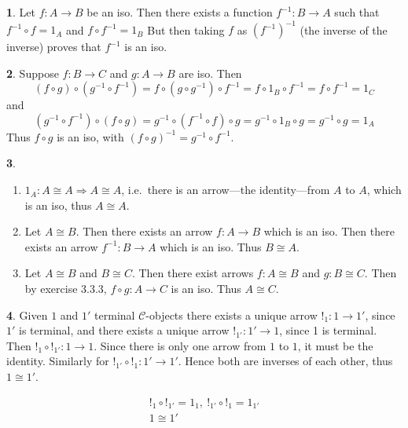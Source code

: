\documentclass{article}
\theoremstyle{definition}
\newcommand{\CC}{\mathscr{C}}
\theoremstyle{definition}
\newtheorem{solution-internal}{}[subsection]
\newenvironment{solution}{
  \begin{solution-internal}
}{
  \end{solution-internal}
}
\begin{document}
\begin{solution} 
  Let $f\colon A \to B$ be an iso. Then there exists a function $f^{-1}\colon
  B \to A$ such that $f^{-1} \circ f = 1_A$ and $f \circ f^{-1} = 1_B$ But
  then taking $f$ as ${(f^{-1})}^{-1}$ (the inverse of the inverse) proves
  that $f^{-1}$ is an iso.
\end{solution}

\begin{solution}
  Suppose $f\colon B \to C$ and $g\colon A \to B$ are iso. Then 
  \[ (f \circ g) \circ (g^{-1} \circ f^{-1}) = f \circ (g \circ g^{-1}) \circ
  f^{-1} = f \circ 1_B \circ f^{-1} = f \circ f^{-1} = 1_C \]
  and 
  \[  (g^{-1} \circ f^{-1}) \circ (f \circ g) = g^{-1} \circ (f^{-1} \circ f)
  \circ g = g^{-1} \circ 1_B \circ g =  g^{-1} \circ g = 1_A \]
  Thus $f \circ g$ is an iso, with $(f \circ g)^{-1} = g^{-1} \circ f^{-1}$.
\end{solution}

\setcounter{subsection}{4}
\setcounter{solution-internal}{0}
\begin{solution}
  $ $
  \begin{enumerate}[label=\roman*.]
    \item $1_A\colon A \cong A \Rightarrow A \cong A$, i.e.\ there is an arrow---the identity---from $A$ to $A$, which is an iso, thus $A \cong A$.
    \item Let $A \cong B$. Then there exists an arrow $f \colon A \to B$ which
      is an iso. Then there exists an arrow $f^{-1} \colon B \to A$ which is an
      iso. Thus $B \cong A$.
    \item Let $A \cong B$ and $B \cong C$. Then there exist arrows $f \colon A
      \cong B$ and $g\colon B \cong C$. Then by exercise 3.3.3, $f \circ g
      \colon A \to C$ is an iso. Thus $A \cong C$.
  \end{enumerate}
\end{solution}

\setcounter{subsection}{6}
\setcounter{solution-internal}{0}
\begin{solution}
  Given $1$ and $1'$ terminal $\CC$-objects there exists a unique arrow $!_1
  \colon 1 \to 1'$, since $1'$ is terminal, and there exists a unique arrow
  $!_{1'} \colon 1' \to 1$, since 1 is terminal. Then $!_1 \circ !_{1'}\colon
  1 \to 1$. Since there is only one arrow from $1$ to $1$, it must be the
  identity. Similarly for $!_{1'} \circ !_1 \colon 1' \to 1'$. Hence both are
  inverses of each other, thus $1 \cong 1'$.

  \begin{center}
  \begin{gather*}
  !_1 \circ !_{1'} = 1_1,~!_{1'} \circ !_1 = 1_{1'}  \\
  1 \cong 1'
  \end{gather*}
  \end{center}
\end{solution}
\end{document}
